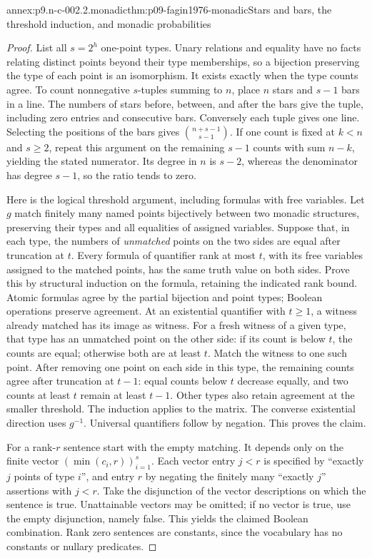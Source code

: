 \begin{annexitem}{annex:p9.n-c-002.2.monadic}{thm:p09-fagin1976-monadic}{Stars and bars, the threshold induction, and monadic probabilities}
\begin{proof}
List all \(s=2^h\) one-point types.  Unary relations and equality
have no facts relating distinct points beyond their type memberships,
so a bijection preserving the type of each point is an isomorphism.
It exists exactly when the type counts agree.  To count nonnegative
\(s\)-tuples summing to \(n\), place \(n\) stars and \(s-1\)
bars in a line.  The numbers of stars before, between, and after the
bars give the tuple, including zero entries and consecutive bars.
Conversely each tuple gives one line.  Selecting the positions of the
bars gives \(\binom{n+s-1}{s-1}\).  If one count is fixed at
\(k<n\) and \(s\geq2\), repeat this argument on the remaining
\(s-1\) counts with sum \(n-k\), yielding the stated numerator.
Its degree in \(n\) is \(s-2\), whereas the denominator has
degree \(s-1\), so the ratio tends to zero.

Here is the logical threshold argument, including formulas with free
variables.  Let \(g\) match finitely many named points bijectively
between two monadic structures, preserving their types and all
equalities of assigned variables.  Suppose that, in each type, the
numbers of \emph{unmatched} points on the two sides are equal after
truncation at \(t\).  Every formula of quantifier rank at most
\(t\), with its free variables assigned to the matched points,
has the same truth value on both sides.  Prove this by structural
induction on the formula, retaining the indicated rank bound.
Atomic formulas agree by the partial bijection and point types;
Boolean operations preserve agreement.  At an existential quantifier
with \(t\geq1\), a witness already matched has its image as witness.
For a fresh witness of a given type, that type has an unmatched point
on the other side: if its count is below \(t\), the counts are
equal; otherwise both are at least \(t\).  Match the witness to
one such point.  After removing one point on each side in this type,
the remaining counts agree after truncation at \(t-1\): equal
counts below \(t\) decrease equally, and two counts at least
\(t\) remain at least \(t-1\).  Other types also retain agreement
at the smaller threshold.  The induction applies to the matrix.
The converse existential direction uses \(g^{-1}\).
Universal quantifiers follow by negation.  This proves the claim.

For a rank-\(r\) sentence start with the empty matching.  It depends
only on the finite vector \((\min(c_i,r))_{i=1}^s\).
Each vector entry \(j<r\) is specified by ``exactly \(j\) points
of type \(i\)'', and entry \(r\) by negating the finitely many
``exactly \(j\)'' assertions with \(j<r\).
Take the disjunction of the vector descriptions on which the sentence
is true.  Unattainable vectors may be omitted; if no vector is true,
use the empty disjunction, namely false.  This yields the claimed
Boolean combination.  Rank zero sentences are constants, since the
vocabulary has no constants or nullary predicates.


\end{proof}
\end{annexitem}
